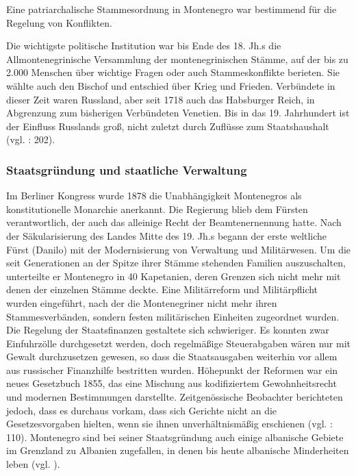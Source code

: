 Eine patriarchalische Stammesordnung in Montenegro war bestimmend für die Regelung von Konflikten.\par
Die wichtigste politische Institution war bis Ende des 18. Jh.s die Allmontenegrinische Versammlung der montenegrinischen Stämme, auf der bis zu 2.000 Menschen über wichtige Fragen oder auch Stammeskonflikte berieten. Sie wählte auch den Bischof und entschied über Krieg und Frieden. Verbündete in dieser Zeit waren Russland, aber seit 1718 auch das Habsburger Reich, in Abgrenzung zum bisherigen Verbündeten Venetien. Bis in das 19. Jahrhundert ist der Einfluss Russlands groß, nicht zuletzt durch Zuflüsse zum Staatshaushalt (vgl. \cite{weithmann} : 202).\par

\subsubsection{Staatsgründung und staatliche Verwaltung }
Im Berliner Kongress wurde 1878 die Unabhängigkeit Montenegros als konstitutionelle Monarchie anerkannt. Die Regierung blieb dem Fürsten verantwortlich, der auch das alleinige Recht der Beamtenernennung hatte. Nach der Säkularisierung des Landes Mitte des 19. Jh.s begann der erste weltliche Fürst (Danilo) mit der Modernisierung von Verwaltung und Militärwesen. Um die seit Generationen an der Spitze ihrer Stämme stehenden Familien auszuschalten, unterteilte er Montenegro in 40 Kapetanien, deren Grenzen sich nicht mehr mit denen der einzelnen Stämme deckte. Eine Militärreform und Militärpflicht wurden eingeführt, nach der die Montenegriner nicht mehr ihren Stammesverbänden, sondern festen militärischen Einheiten zugeordnet wurden. Die Regelung der Staatsfinanzen gestaltete sich schwieriger. Es konnten zwar Einfuhrzölle durchgesetzt werden, doch regelmäßige Steuerabgaben wären nur mit Gewalt durchzusetzen gewesen, so dass die Staatsausgaben weiterhin vor allem aus russischer Finanzhilfe bestritten wurden. Höhepunkt der Reformen war ein neues Gesetzbuch 1855, das eine Mischung aus kodifiziertem Gewohnheitsrecht und modernen Bestimmungen darstellte. Zeitgenössische Beobachter berichteten jedoch, dass es durchaus vorkam, dass sich Gerichte nicht an die Gesetzesvorgaben hielten, wenn sie ihnen unverhältnismäßig erschienen (vgl. \cite{dickel} : 110). Montenegro sind bei seiner Staatsgründung auch einige albanische Gebiete im Grenzland zu Albanien zugefallen, in denen bis heute albanische Minderheiten leben (vgl. \cite{hoenehhol}).\par
